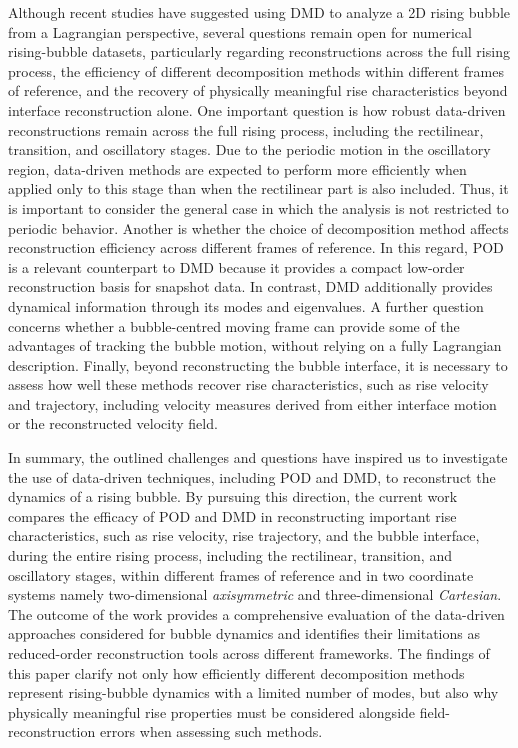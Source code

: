 \documentclass[a4paper,fleqn]{cas-sc}
\begin{document}
	Although recent studies have suggested using DMD to analyze a 2D rising bubble from a Lagrangian perspective, several questions remain open for numerical rising-bubble datasets, particularly regarding reconstructions across the full rising process, the efficiency of different decomposition methods within different frames of reference, and the recovery of physically meaningful rise characteristics beyond interface reconstruction alone. One important question is how robust data-driven reconstructions remain across the full rising process, including the rectilinear, transition, and oscillatory stages. Due to the periodic motion in the oscillatory region, data-driven methods are expected to perform more efficiently when applied only to this stage than when the rectilinear part is also included. Thus, it is important to consider the general case in which the analysis is not restricted to periodic behavior. Another is whether the choice of decomposition method affects reconstruction efficiency across different frames of reference. In this regard, POD is a relevant counterpart to DMD because it provides a compact low-order reconstruction basis for snapshot data.
    In contrast, DMD additionally provides dynamical information through its modes and eigenvalues. A further question concerns whether a bubble-centred moving frame can provide some of the advantages of tracking the bubble motion, without relying on a fully Lagrangian description. Finally, beyond reconstructing the bubble interface, it is necessary to assess how well these methods recover rise characteristics, such as rise velocity and trajectory, including velocity measures derived from either interface motion or the reconstructed velocity field.
	
	In summary, the outlined challenges and questions have inspired us to investigate the use of data-driven techniques, including POD and DMD, to reconstruct the dynamics of a rising bubble. By pursuing this direction, the current work compares the efficacy of POD and DMD in reconstructing important rise characteristics, such as rise velocity, rise trajectory, and the bubble interface, during the entire rising process, including the rectilinear, transition, and oscillatory stages, within different frames of reference and in two coordinate systems namely two-dimensional \textit{axisymmetric} and three-dimensional \textit{Cartesian}. The outcome of the work provides a comprehensive evaluation of the data-driven approaches considered for bubble dynamics and identifies their limitations as reduced-order reconstruction tools across different frameworks. The findings of this paper clarify not only how efficiently different decomposition methods represent rising-bubble dynamics with a limited number of modes, but also why physically meaningful rise properties must be considered alongside field-reconstruction errors when assessing such methods.
	
\end{document}
